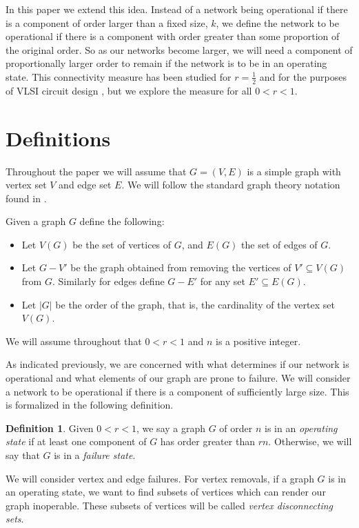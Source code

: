 \documentclass[12pt]{article}
\theoremstyle{definition}
\newtheorem{definition}[theorem]{Definition}
\begin{document}
In this paper we extend this idea. Instead of a network being operational if there is a component of order larger than a fixed size, $k$, we define the network to be operational if there is a component with order greater than some proportion of the original order. So as our networks become larger, we will need a component of proportionally larger order to remain if the network is to be in an operating state. This connectivity measure has been studied for $r=\frac{1}{2}$ and for the purposes of VLSI circuit design \cite{harary}, but we explore the measure for all $0<r<1$.

\section{Definitions}
Throughout the paper we will assume that $G=(V,E)$ is a simple graph with vertex set $V$ and edge set $E$. We will follow the standard graph theory notation found in \cite{Gross2006}. 

Given a graph $G$ define the following: 
\begin{itemize}
  \item Let $V(G)$ be the set of vertices of $G$, and $E(G)$ the set of edges of $G$.  
  \item Let $G-V'$ be the graph obtained from removing the vertices of $V'\subseteq V(G)$ from $G$. Similarly for edges define $G-E'$ for any set $E' \subseteq E(G).$
  
  \item Let $|G|$ be the order of the graph, that is, the cardinality of the vertex set $V(G)$.
\end{itemize}

We will assume throughout that $0 < r < 1$ and $n$ is a positive integer. 

As indicated previously, we are concerned with what determines if our network is operational and what elements of our graph are prone to failure. We will consider a network to be operational if there is a component of sufficiently large size. This is formalized in the following definition. 
\begin{definition} 
Given $0<r<1$, we say a graph $G$ of order $n$ is in an \textit{operating state} if at least one component of $G$ has order greater than $rn$. Otherwise, we will say that $G$ is in a \textit{failure state}. 
\end{definition}

We will consider vertex and edge failures. For vertex removals, if a graph $G$ is in an operating state, we want to find subsets of vertices which can render our graph inoperable. These subsets of vertices will be called \textit{vertex disconnecting sets}.
\end{document}
